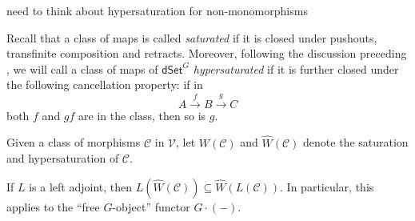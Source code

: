 \documentclass[a4paper,10pt,draft]{article}%
\numberwithin{equation}{section}%
\numberwithin{figure}{section}
\begin{document}
{\color{red} need to think about hypersaturation for non-monomorphisms}

Recall that a class of maps is called \textit{saturated}
if it is closed under pushouts, transfinite composition and retracts.
Moreover, following the discussion preceding \cite[Prop. 3.6.8]{HHM16}, we will call a class of maps of $\mathsf{dSet}^G$ \textit{hypersaturated} if it is further closed under the following cancellation property: if in
\[
A \xrightarrow{f} B \xrightarrow{g} C
\]
both $f$ and $gf$ are in the class, then so is $g$.

\begin{notation}
      Given a class of morphisms $\mathcal{C}$ in $\mathcal V$, let
      $W(\mathcal C)$ and $\hat{W}(\mathcal C)$ denote
      the saturation and hypersaturation of $\mathcal C$. 
\end{notation}

\begin{remark}
      If $L$ is a left adjoint, then $L(\hat{W}(\mathcal C)) \subseteq \hat{W}(L(\mathcal C))$.
      In particular, this applies to the ``free $G$-object'' functor $G \cdot (-)$.
\end{remark}
\end{document}
